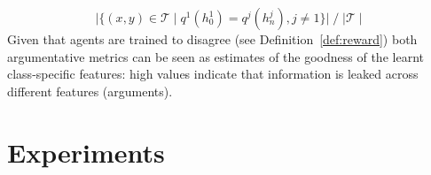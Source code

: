 \vspace*{-0.1cm}
    \[    \Big| \{ (x, y) \in \mathcal{T} \mid q^1 (h^1_0) = q^j (h^j_n),  j \neq 1 \}\Big|
    \; / \; {\mid \mathcal{T} \mid}
    \]
Given that agents are trained to disagree (see Definition~\ref{def:reward}) both %
argumentative metrics can be seen as estimates of the goodness of the learnt class-specific features: high %
values indicate that information is leaked across different features (arguments).  

\iffalse 
       \begin{enumerate}[(v)] 
        \item \emph{Pro resolution rate}: 
        \begin{align*}
             \frac{\Big| \{ (x, y) \in \mathcal{T} \mid q^1 (h^1_0) = q^j (h^j_t), j \neq 1, \; %
             t \in ]n] \}\Big|}{|\mathcal{T}|  n} 
        \end{align*}



        
    \end{enumerate}

\fi

\section{Experiments}
\label{sec:results}

